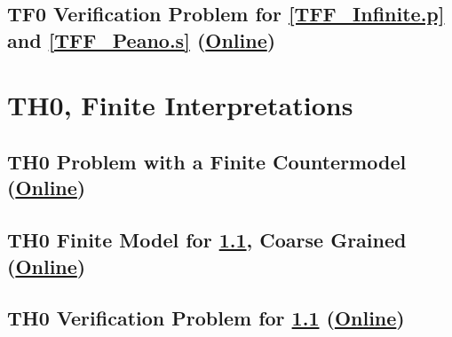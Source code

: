\documentclass{easychair}
\begin{document}
\begin{minipage}{\textwidth}
\subsection{TF0 Verification Problem for \ref{TFF_Infinite.p} and \ref{TFF_Peano.s}
(\href{https://raw.githubusercontent.com/GeoffsPapers/InterpretationFormat/master/Examples/TFF_Peano.s.p}{Online})}
\label{TFF_Peano.s.p}
\begin{small}

\end{small}
\end{minipage}

\begin{minipage}{\textwidth}
\section{TH0, Finite Interpretations}
\label{TH0Finite}

\subsection{TH0 Problem with a Finite Countermodel
(\href{https://raw.githubusercontent.com/GeoffsPapers/InterpretationFormat/master/Examples/THF_Finite.p}{Online})}
\label{THF_Finite.p}
\begin{small}

\end{small}
\end{minipage}

\begin{minipage}{\textwidth}
\subsection{TH0 Finite Model for \ref{THF_Finite.p}, Coarse Grained
(\href{https://raw.githubusercontent.com/GeoffsPapers/InterpretationFormat/master/Examples/THF_Finite.s}{Online})}
\label{THF_Finite.s}
\begin{small}

\end{small}
\end{minipage}

\begin{minipage}{\textwidth}
\subsection{TH0 Verification Problem for \ref{THF_Finite.p}
(\href{https://raw.githubusercontent.com/GeoffsPapers/InterpretationFormat/master/Examples/THF_Finite.s.p}{Online})}
\label{THF_Finite.s.p}
\begin{small}

\end{small}
\end{minipage}
\end{document}

